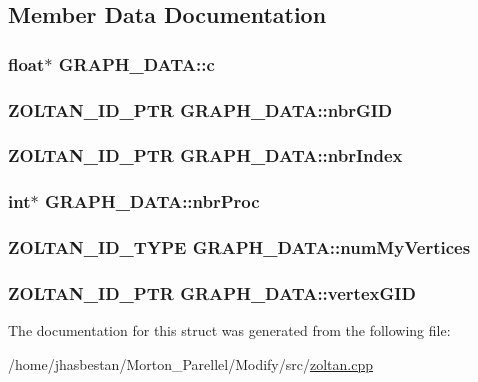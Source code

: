 \subsection{Member Data Documentation}
\hypertarget{structGRAPH__DATA_a2877a92dc19abd72be755179b6f38754}{
\subsubsection[{c}]{\setlength{\rightskip}{0pt plus 5cm}float$\ast$ {\bf GRAPH\_\-DATA::c}}}
\label{structGRAPH__DATA_a2877a92dc19abd72be755179b6f38754}
\hypertarget{structGRAPH__DATA_a7c2d0b84cdc9f48eec34d9ad6332b0c3}{
\subsubsection[{nbrGID}]{\setlength{\rightskip}{0pt plus 5cm}ZOLTAN\_\-ID\_\-PTR {\bf GRAPH\_\-DATA::nbrGID}}}
\label{structGRAPH__DATA_a7c2d0b84cdc9f48eec34d9ad6332b0c3}
\hypertarget{structGRAPH__DATA_a5a9a5909b93415c0f4cf5e2ad9b1596d}{
\subsubsection[{nbrIndex}]{\setlength{\rightskip}{0pt plus 5cm}ZOLTAN\_\-ID\_\-PTR {\bf GRAPH\_\-DATA::nbrIndex}}}
\label{structGRAPH__DATA_a5a9a5909b93415c0f4cf5e2ad9b1596d}
\hypertarget{structGRAPH__DATA_ac885413f0f7d9c05484f23fe372a579b}{
\subsubsection[{nbrProc}]{\setlength{\rightskip}{0pt plus 5cm}int$\ast$ {\bf GRAPH\_\-DATA::nbrProc}}}
\label{structGRAPH__DATA_ac885413f0f7d9c05484f23fe372a579b}
\hypertarget{structGRAPH__DATA_acf91afd46dc4b3b603d9276cbbd8b03a}{
\subsubsection[{numMyVertices}]{\setlength{\rightskip}{0pt plus 5cm}ZOLTAN\_\-ID\_\-TYPE {\bf GRAPH\_\-DATA::numMyVertices}}}
\label{structGRAPH__DATA_acf91afd46dc4b3b603d9276cbbd8b03a}
\hypertarget{structGRAPH__DATA_aa9096fe0ecdd85dcecacee0506c53f29}{
\subsubsection[{vertexGID}]{\setlength{\rightskip}{0pt plus 5cm}ZOLTAN\_\-ID\_\-PTR {\bf GRAPH\_\-DATA::vertexGID}}}
\label{structGRAPH__DATA_aa9096fe0ecdd85dcecacee0506c53f29}


The documentation for this struct was generated from the following file:\begin{DoxyCompactItemize}
\item 
/home/jhasbestan/Morton\_\-Parellel/Modify/src/\hyperlink{zoltan_8cpp}{zoltan.cpp}\end{DoxyCompactItemize}
